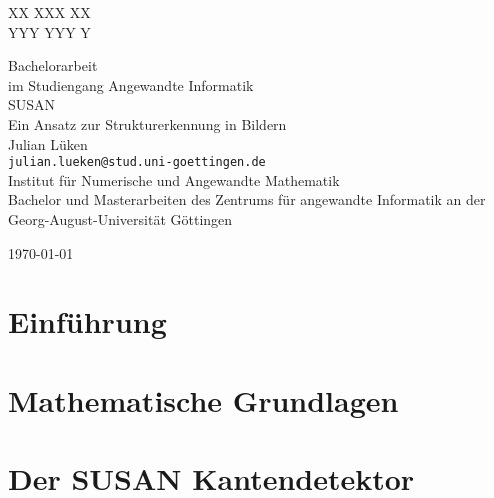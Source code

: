 \documentclass[a4paper, 11pt]{report}
\newcommand{\mytitle}{\LARGE}
\newcommand{\titlespace}{\vspace{6em}}
\theoremstyle{definition}
\newenvironment{myAbstract}{\section*{Abstract}}{}
\begin{document}
\begin{titlepage}
	\begin{center}
		\begin{minipage}{.49\textwidth}
			\flushleft
			
		\end{minipage}
		\begin{minipage}{.49\textwidth}
			\flushright
			XX XXX XX\\
			YYY YYY Y
		\end{minipage}
		\begin{minipage}{.5\textwidth}
			\begin{center}
				\vspace{2cm}
				\mytitle 		{Bachelorarbeit}\\
				\normalsize 	im Studiengang \glqq Angewandte Informatik\grqq\\
				\titlespace
				\mytitle 		{SUSAN}\\
				\normalsize 	Ein Ansatz zur Strukturerkennung in Bildern\\
				
				\titlespace		Julian Lüken\\
								\texttt{julian.lueken@stud.uni-goettingen.de}\\
				\titlespace		Institut für Numerische und Angewandte Mathematik\\
				\titlespace		Bachelor und Masterarbeiten des Zentrums für angewandte Informatik an der Georg-August-Universität Göttingen
				
				\titlespace		\today
			\end{center}
		\end{minipage}
	\end{center}
\end{titlepage}

\restoregeometry
{}
\pagestyle{empty}


\tableofcontents
\pagebreak
\restoregeometry
\pagestyle{headings}

\chapter{Einführung}

\chapter{Mathematische Grundlagen}
\chapter{Der SUSAN Kantendetektor}
\end{document}

